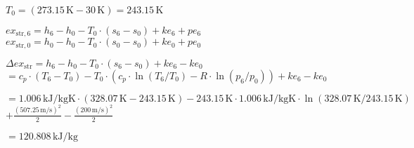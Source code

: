 \( T_0 = (273.15 \, \text{K} - 30 \, \text{K}) = 243.15 \, \text{K} \)  

\( ex_{\text{str},6} = h_6 - h_0 - T_0 \cdot (s_6 - s_0) + ke_6 + pe_6 \)  
\( ex_{\text{str},0} = h_0 - h_0 - T_0 \cdot (s_0 - s_0) + ke_0 + pe_0 \)  

\( \Delta ex_{\text{str}} = h_6 - h_0 - T_0 \cdot (s_6 - s_0) + ke_6 - ke_0 \)  
\( = c_p \cdot (T_6 - T_0) - T_0 \cdot (c_p \cdot \ln(T_6/T_0) - R \cdot \ln(p_6/p_0)) + ke_6 - ke_0 \)  

\( = 1.006 \, \text{kJ}/\text{kgK} \cdot (328.07 \, \text{K} - 243.15 \, \text{K}) - 243.15 \, \text{K} \cdot 1.006 \, \text{kJ}/\text{kgK} \cdot \ln(328.07 \, \text{K}/243.15 \, \text{K}) \)  
\( + \frac{(507.25 \, \text{m/s})^2}{2} - \frac{(200 \, \text{m/s})^2}{2} \)  

\( = 120.808 \, \text{kJ}/\text{kg} \)